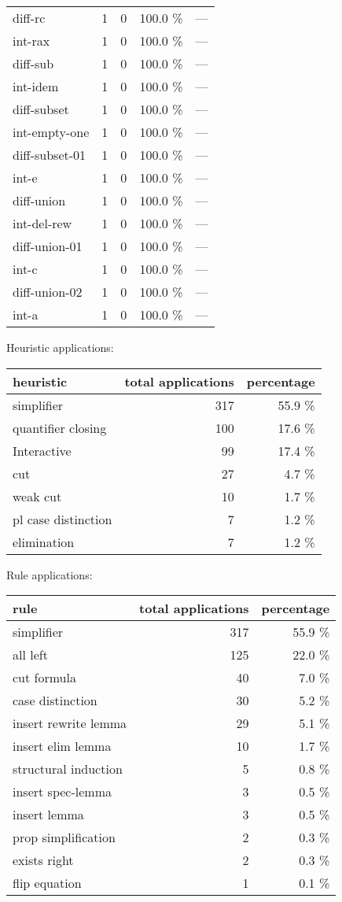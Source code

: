 \documentclass[a4paper]{article}
\begin{document}
\begin{supertabular}{l|r|r|r|r}
diff-rc & 1 & 0 & 100.0 \% & ---\\
int-rax & 1 & 0 & 100.0 \% & ---\\
diff-sub & 1 & 0 & 100.0 \% & ---\\
int-idem & 1 & 0 & 100.0 \% & ---\\
diff-subset & 1 & 0 & 100.0 \% & ---\\
int-empty-one & 1 & 0 & 100.0 \% & ---\\
diff-subset-01 & 1 & 0 & 100.0 \% & ---\\
int-e & 1 & 0 & 100.0 \% & ---\\
diff-union & 1 & 0 & 100.0 \% & ---\\
int-del-rew & 1 & 0 & 100.0 \% & ---\\
diff-union-01 & 1 & 0 & 100.0 \% & ---\\
int-c & 1 & 0 & 100.0 \% & ---\\
diff-union-02 & 1 & 0 & 100.0 \% & ---\\
int-a & 1 & 0 & 100.0 \% & ---\\

\end{supertabular}

Heuristic applications:

\begin{supertabular}{l|r|r}
heuristic	& total applications & percentage \\ \hline
simplifier & 317 & 55.9 \% \\
quantifier closing & 100 & 17.6 \% \\
Interactive & 99 & 17.4 \% \\
cut & 27 & 4.7 \% \\
weak cut & 10 & 1.7 \% \\
pl case distinction & 7 & 1.2 \% \\
elimination & 7 & 1.2 \% \\

\end{supertabular}

Rule applications:

\begin{supertabular}{l|r|r}
rule	        & total applications & percentage \\ \hline
simplifier & 317 & 55.9 \% \\
all left & 125 & 22.0 \% \\
cut formula & 40 & 7.0 \% \\
case distinction & 30 & 5.2 \% \\
insert rewrite lemma & 29 & 5.1 \% \\
insert elim lemma & 10 & 1.7 \% \\
structural induction & 5 & 0.8 \% \\
insert spec-lemma & 3 & 0.5 \% \\
insert lemma & 3 & 0.5 \% \\
prop simplification & 2 & 0.3 \% \\
exists right & 2 & 0.3 \% \\
flip equation & 1 & 0.1 \% \\

\end{supertabular}
\end{document}
